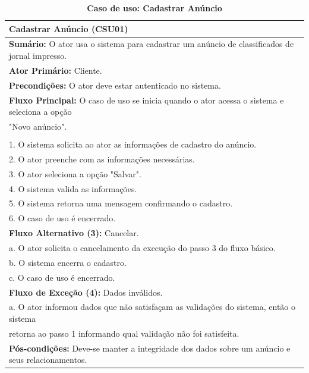 \documentclass[
	12pt,				%
	openright,			%
	oneside,			%
	a4paper,			%
	chapter=TITLE,		%
	section=TITLE,		%
	english,			%
	french,				%
	spanish,			%
	brazil				%
	]{abntex2}
\begin{document}
\begin{table}[h!]
	\center\scriptsize
	\caption{\textbf{Caso de uso: Cadastrar Anúncio}}
	\begin{tabular}{|l|} \hline \label{tab-csu-cadastrarAnuncio}
		\textbf{Cadastrar Anúncio (CSU01)} \\ \hline
		
		\textbf{Sumário:} O ator usa o sistema para cadastrar um anúncio de classificados de jornal impresso. \\
		\textbf{Ator Primário:} Cliente. \\
		\textbf{Precondições:} O ator deve estar autenticado no sistema. \\ \hline
		
		\textbf{Fluxo Principal:} O caso de uso se inicia quando o ator acessa o sistema e seleciona a opção \\"Novo anúncio". \\ \\

		
		1.	O sistema solicita ao ator as informações de cadastro do anúncio. \\
		2.	O ator preenche com as informações necessárias. \\
		3.  O ator seleciona a opção "Salvar". \\
		4.  O sistema valida as informações. \\
		5.  O sistema retorna uma mensagem confirmando o cadastro. \\
		6.	O caso de uso é encerrado. \\ \hline

		\textbf{Fluxo Alternativo (3):} Cancelar.\\ 
		a. O ator solicita o cancelamento da execução do passo 3 do fluxo básico.\\
		b. O sistema encerra o cadastro. \\
		c. O caso de uso é encerrado. \\ \hline

		\textbf{Fluxo de Exceção (4):} Dados inválidos.\\
		a. O ator informou dados que não satisfaçam as validações do sistema, então o sistema \\ retorna ao passo 1 informando qual validação não foi satisfeita.\\ \hline
		
		\textbf{Pós-condições:} Deve-se manter a integridade dos dados sobre um anúncio e seus relacionamentos. \\ \hline
				
	\end{tabular}
\end{table}
\end{document}
